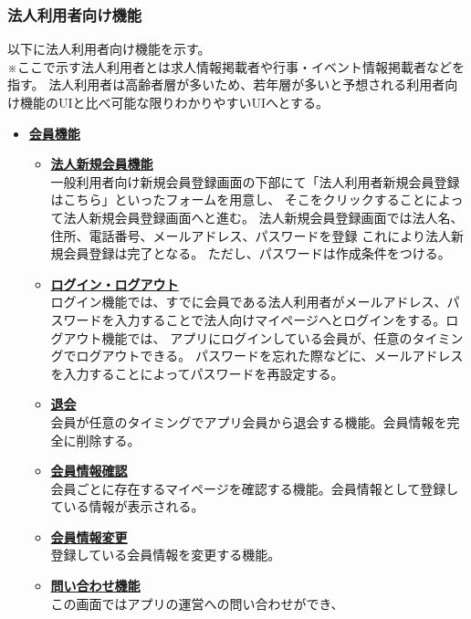 \documentclass[a4paper,dvipdfmx]{jarticle}
\begin{document}
\subsubsection{法人利用者向け機能}
以下に法人利用者向け機能を示す。 \\
※ここで示す法人利用者とは求人情報掲載者や行事・イベント情報掲載者などを指す。
法人利用者は高齢者層が多いため、若年層が多いと予想される利用者向け機能のUIと比べ可能な限りわかりやすいUIへとする。
\begin{itemize}
    \item \underline{\textbf{会員機能}}
          \begin{itemize}
              \item[-] \underline{\textbf{法人新規会員機能}}\\
                  一般利用者向け新規会員登録画面の下部にて「法人利用者新規会員登録はこちら」といったフォームを用意し、
                  そこをクリックすることによって法人新規会員登録画面へと進む。
                  法人新規会員登録画面では法人名、住所、電話番号、メールアドレス、パスワードを登録
                  これにより法人新規会員登録は完了となる。
                  ただし、パスワードは作成条件をつける。
              \item[-] \underline{\textbf{ログイン・ログアウト}}\\
                  ログイン機能では、すでに会員である法人利用者がメールアドレス、パスワードを入力することで法人向けマイページへとログインをする。ログアウト機能では、
                  アプリにログインしている会員が、任意のタイミングでログアウトできる。
                  パスワードを忘れた際などに、メールアドレスを入力することによってパスワードを再設定する。
              \item[-] \underline{\textbf{退会}}\\
                  会員が任意のタイミングでアプリ会員から退会する機能。会員情報を完全に削除する。
              \item[-] \underline{\textbf{会員情報確認}}\\
                  会員ごとに存在するマイページを確認する機能。会員情報として登録している情報が表示される。
              \item[-] \underline{\textbf{会員情報変更}}\\
                  登録している会員情報を変更する機能。
              \item[-] \underline{\textbf{問い合わせ機能}}\\
                  この画面ではアプリの運営への問い合わせができ、

\end{itemize}
\end{itemize}
\end{document}
